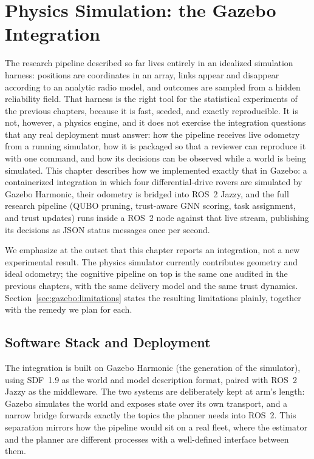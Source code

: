 \section{Physics Simulation: the Gazebo Integration}
\label{sec:gazebo}

The research pipeline described so far lives entirely in an idealized
simulation harness: positions are coordinates in an array, links appear and
disappear according to an analytic radio model, and outcomes are sampled
from a hidden reliability field. That harness is the right tool for the
statistical experiments of the previous chapters, because it is fast,
seeded, and exactly reproducible. It is not, however, a physics engine,
and it does not exercise the integration questions that any real
deployment must answer: how the pipeline receives live odometry from a
running simulator, how it is packaged so that a reviewer can reproduce it
with one command, and how its decisions can be observed while a world is
being simulated. This chapter describes how we implemented exactly that
in Gazebo: a containerized integration in which four differential-drive
rovers are simulated by Gazebo Harmonic, their odometry is bridged into
ROS~2 Jazzy, and the full research pipeline (QUBO pruning, trust-aware
GNN scoring, task assignment, and trust updates) runs inside a ROS~2 node
against that live stream, publishing its decisions as JSON status
messages once per second.

We emphasize at the outset that this chapter reports an integration, not
a new experimental result. The physics simulator currently contributes
geometry and ideal odometry; the cognitive pipeline on top is the same
one audited in the previous chapters, with the same delivery model and
the same trust dynamics. Section~\ref{sec:gazebo:limitations} states the
resulting limitations plainly, together with the remedy we plan for
each.

\subsection{Software Stack and Deployment}
\label{sec:gazebo:stack}

The integration is built on Gazebo Harmonic (the 
generation of the simulator), using SDF~1.9 as the world and model
description format, paired with ROS~2 Jazzy as the middleware. The two
systems are deliberately kept at arm's length: Gazebo simulates the world
and exposes state over its own transport, and a narrow bridge forwards
exactly the topics the planner needs into ROS~2. This separation mirrors
how the pipeline would sit on a real fleet, where the estimator and the
planner are different processes with a well-defined interface between
them.

